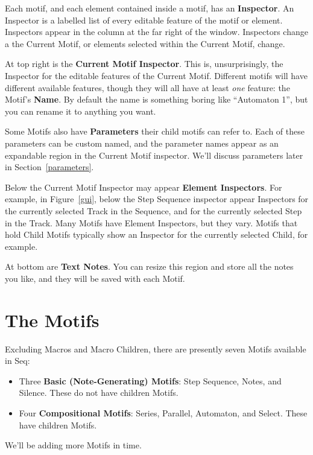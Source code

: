 \documentclass[twoside,10pt]{article}
\begin{document}
Each motif, and each element contained inside a motif, has an {\bf Inspector}.  An Inspector is a labelled list of every editable feature of the motif or element.  Inspectors appear in the column at the far right of the window.  Inspectors change a the Current Motif, or elements selected within the Current Motif, change.

At top right is the {\bf Current Motif Inspector}.  This is, unsurprisingly, the Inspector for the editable features of the Current Motif.  Different motifs will have different available features, though they will all have at least {\it one} feature: the Motif's {\bf Name}.  By default the name is something boring like ``Automaton 1'', but you can rename it to anything you want.

Some Motifs also have {\bf Parameters} their child motifs can refer to.  Each of these parameters can be custom named, and the parameter names appear as an expandable region in the Current Motif inspector.  We'll discuss parameters later in Section~\ref{parameters}.

Below the Current Motif Inspector may appear {\bf Element Inspectors}.  For example, in Figure~\ref{gui}, below the Step Sequence inspector appear Inspectors for the currently selected Track in the Sequence, and for the currently selected Step in the Track.  Many Motifs have Element Inspectors, but they vary.  Motifs that hold Child Motifs typically show an Inspector for the currently selected Child, for example.

At bottom are {\bf Text Notes}.  You can resize this region and store all the notes you like, and they will be saved with each Motif.

\clearpage\section{The Motifs}
\label{motifs}

Excluding Macros and Macro Children, there are presently seven Motifs available in Seq:

\begin{itemize}
\item Three {\bf Basic (Note-Generating) Motifs}: Step Sequence, Notes, and Silence.  These do not have children Motifs.
\item Four {\bf Compositional Motifs}: Series, Parallel, Automaton, and Select.  These have children Motifs.
\end{itemize}

We'll be adding more Motifs in time.
\end{document}
